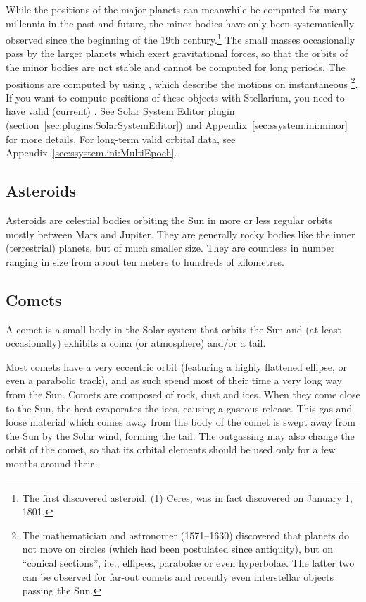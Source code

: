 While the positions of the major planets can meanwhile be computed for
many millennia in the past and future, the minor bodies have only been
systematically observed since the beginning of the 19th
century.\footnote{The first discovered asteroid, (1) Ceres, was in
  fact discovered on January 1, 1801.} The small masses occasionally
pass by the larger planets which exert gravitational forces, so that
the orbits of the minor bodies are not stable and cannot be computed
for long periods. The positions are computed by using
, which describe the motions on
instantaneous \footnote{The mathematician and
  astronomer  (1571--1630) discovered that
  planets do not move on circles (which had been postulated since
  antiquity), but on ``conical sections'', i.e., ellipses, parabolae
  or even hyperbolae. The latter two can be observed for far-out
  comets and recently even interstellar objects passing the Sun.}. If
you want to compute positions of these objects with Stellarium, you
need to have valid (current) . See
Solar System Editor plugin (section~\ref{sec:plugins:SolarSystemEditor}) and 
Appendix~\ref{sec:ssystem.ini:minor} for more details. For long-term valid orbital data,
see Appendix~\ref{sec:ssystem.ini:MultiEpoch}.

\subsection{Asteroids}
\label{sec:Phenomena:Asteroids}

Asteroids are celestial bodies orbiting the Sun in more or less regular
orbits mostly between Mars and Jupiter. They are generally rocky bodies
like the inner (terrestrial) planets, but of much smaller size. They
are countless in number ranging in size from about ten meters to
hundreds of kilometres.

\subsection{Comets}
\label{sec:Phenomena:Comets}

A comet is a small body in the Solar system that orbits the Sun and (at
least occasionally) exhibits a coma (or atmosphere) and/or a tail.

Most comets have a very eccentric orbit (featuring a highly flattened
ellipse, or even a parabolic track), and as such spend most of their
time a very long way from the Sun. Comets are composed of rock, dust
and ices. When they come close to the Sun, the heat evaporates the
ices, causing a gaseous release. This gas and loose material which
comes away from the body of the comet is swept away from the Sun by
the Solar wind, forming the tail. The outgassing may also change the
orbit of the comet, so that its orbital elements should be used only
for a few months around their . 

